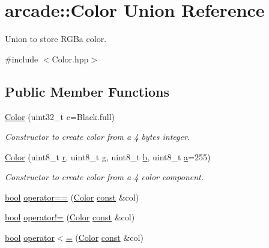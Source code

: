 \hypertarget{unionarcade_1_1_color}{\section{arcade\-:\-:Color Union Reference}
\label{unionarcade_1_1_color}
}


Union to store R\-G\-Ba color.  




{\ttfamily \#include $<$Color.\-hpp$>$}

\subsection*{Public Member Functions}
\begin{DoxyCompactItemize}
\item 
\hyperlink{unionarcade_1_1_color_a053784aa4df3917111e2717d74fa3d85}{Color} (uint32\-\_\-t c=Black.\-full)
\begin{DoxyCompactList}\small\item\em Constructor to create color from a 4 bytes integer. \end{DoxyCompactList}\item 
\hyperlink{unionarcade_1_1_color_acf519d304c0dae64e28b976414af0753}{Color} (uint8\-\_\-t \hyperlink{unionarcade_1_1_color_a20637c0cb142a384bd034cceacafe6e0}{r}, uint8\-\_\-t \hyperlink{unionarcade_1_1_color_a97c509df99c9b119622f4b2ff8b3f21b}{g}, uint8\-\_\-t \hyperlink{unionarcade_1_1_color_a7edec98cabcfdeb71ae750e7442a6baf}{b}, uint8\-\_\-t \hyperlink{unionarcade_1_1_color_ae2f888f27d844d24f9ef10917f42d2dc}{a}=255)
\begin{DoxyCompactList}\small\item\em Constructor to create color from a 4 color component. \end{DoxyCompactList}\item 
\hyperlink{term__entry_8h_a002004ba5d663f149f6c38064926abac}{bool} \hyperlink{unionarcade_1_1_color_a83a50461144496e223210c16a3e37d4e}{operator==} (\hyperlink{unionarcade_1_1_color}{Color} \hyperlink{term__entry_8h_a57bd63ce7f9a353488880e3de6692d5a}{const} \&col)
\item 
\hyperlink{term__entry_8h_a002004ba5d663f149f6c38064926abac}{bool} \hyperlink{unionarcade_1_1_color_aedb97f3185cb3c8da0c20741ce8738cd}{operator!=} (\hyperlink{unionarcade_1_1_color}{Color} \hyperlink{term__entry_8h_a57bd63ce7f9a353488880e3de6692d5a}{const} \&col)
\item 
\hyperlink{term__entry_8h_a002004ba5d663f149f6c38064926abac}{bool} \hyperlink{unionarcade_1_1_color_a1ec33b6fd522a346562408bccdbb8e40}{operator$<$=} (\hyperlink{unionarcade_1_1_color}{Color} \hyperlink{term__entry_8h_a57bd63ce7f9a353488880e3de6692d5a}{const} \&col)

\end{DoxyCompactItemize}
